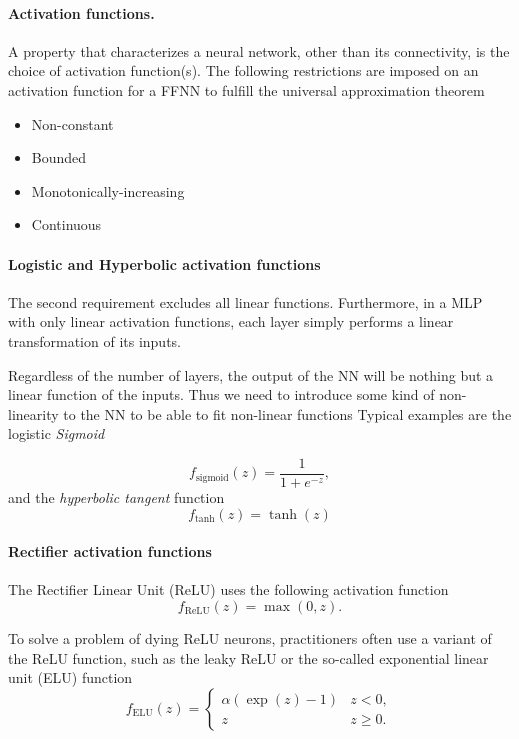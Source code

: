 \documentclass[%
oneside,                 %
final,                   %
10pt]{article}
\begin{document}
\paragraph{Activation functions.}
A property that characterizes a neural network, other than its
connectivity, is the choice of activation function(s).  The following restrictions are imposed on an activation function for a FFNN to fulfill the universal approximation theorem

\begin{itemize}
  \item Non-constant

  \item Bounded

  \item Monotonically-increasing

  \item Continuous
\end{itemize}

\noindent
\paragraph{Logistic and Hyperbolic activation functions}
The second requirement excludes all linear functions. Furthermore, in
a MLP with only linear activation functions, each layer simply
performs a linear transformation of its inputs.

Regardless of the number of layers, the output of the NN will be
nothing but a linear function of the inputs. Thus we need to introduce
some kind of non-linearity to the NN to be able to fit non-linear
functions Typical examples are the logistic \emph{Sigmoid}

\[
 f_\mathrm{sigmoid}(z) = \frac{1}{1 + e^{-z}},
\]
and the \emph{hyperbolic tangent} function
\[
 f_\mathrm{tanh}(z) = \tanh(z)
\]

\paragraph{Rectifier activation functions}
The Rectifier Linear Unit (ReLU) uses the following activation function
\[
f_\mathrm{ReLU}(z) = \max(0,z).
\]

To solve a problem of dying ReLU neurons, practitioners often use a  variant of the ReLU
function, such as the leaky ReLU or the so-called
exponential linear unit (ELU) function
\[
f_\mathrm{ELU}(z) = \left\{\begin{array}{cc} \alpha\left( \exp{(z)}-1\right) & z < 0,\\  z & z \ge 0.\end{array}\right. 
\]
\end{document}

